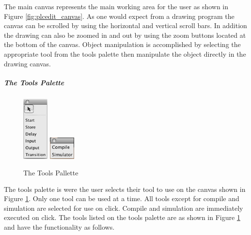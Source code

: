 The main canvas represents the main working area for the user as shown 
in Figure \ref{fig:plcedit_canvas}. As one would expect from a drawing
program the canvas can be scrolled by using the horizontal and vertical 
scroll bars. In addition the drawing can also be zoomed in and out by 
using the zoom buttons located at the bottom of the canvas. Object 
manipulation is accomplished by selecting the appropriate tool from the 
tools palette then manipulate the object directly in the drawing canvas.

\subparagraph{The Tools Palette}

\begin{figure}[htp]
    \centering
    \includegraphics[width=50px]{./images/plcedit_tools.png}
    \includegraphics[width=50px]{./images/plcedit_actions.png}
    \caption{The Tools Pallette}
    \label{fig:plcedit_tools}
\end{figure}

The tools palette is were the user selects their tool to use on the 
canvas shown in Figure \ref{fig:plcedit_tools}. Only one tool can be 
used at a time. All tools except for compile and simulation are selected
for use on click. Compile and simulation are immediately executed on click.
The tools listed on the tools palette are as shown in Figure  \ref{fig:plcedit_tools}
and have the functionality as follows.


